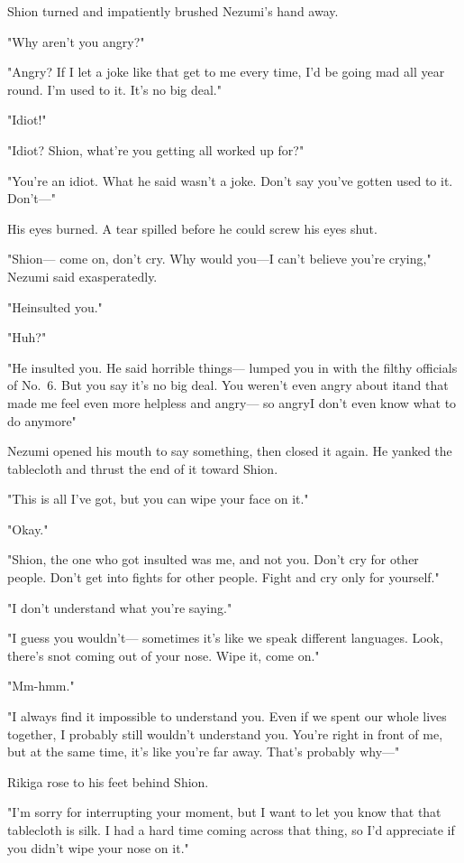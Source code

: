 Shion turned and impatiently brushed Nezumi's hand away.

"Why aren't you angry?"

"Angry? If I let a joke like that get to me every time, I'd be going mad
all year round. I'm used to it. It's no big deal."

"Idiot!"

"Idiot? Shion, what're you getting all worked up for?"

"You're an idiot. What he said wasn't a joke. Don't say you've gotten
used to it. Don't---"

His eyes burned. A tear spilled before he could screw his eyes shut.

"Shion--- come on, don't cry. Why would you\el ---I can't believe you're
crying," Nezumi said exasperatedly.

"He\el insulted you."

"Huh?"

"He insulted you. He said horrible things--- lumped you in with the filthy
officials of No.~6. But you say it's no big deal. You weren't even angry
about it\el and that made me feel even more helpless and angry--- so
angry\el I don't even know what to do anymore\el "

Nezumi opened his mouth to say something, then closed it again. He
yanked the tablecloth and thrust the end of it toward Shion.

"This is all I've got, but you can wipe your face on it."

"Okay."

"Shion, the one who got insulted was me, and not you. Don't cry for
other people. Don't get into fights for other people. Fight and cry only
for yourself."

"I don't understand what you're saying."

"I guess you wouldn't--- sometimes it's like we speak different languages.
Look, there's snot coming out of your nose. Wipe it, come on."

"Mm-hmm."

"I always find it impossible to understand you. Even if we spent our
whole lives together, I probably still wouldn't understand you. You're
right in front of me, but at the same time, it's like you're far away.
That's probably why---"

Rikiga rose to his feet behind Shion.

"I'm sorry for interrupting your moment, but I want to let you know that
that tablecloth is silk. I had a hard time coming across that thing, so
I'd appreciate if you didn't wipe your nose on it."

